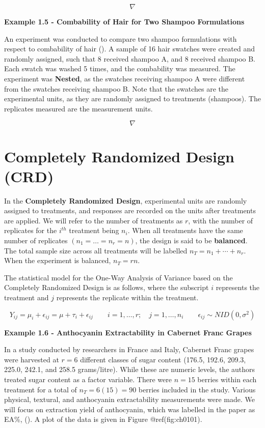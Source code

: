 \documentclass[
]{book}
\begin{document}
\[\nabla\]

\textbf{Example 1.5 - Combability of Hair for Two Shampoo Formulations}

An experiment was conducted to compare two shampoo formulations with
respect to combability of hair (). A sample of 16 hair swatches were created and randomly
assigned, such that 8 received shampoo A, and 8 received shampoo B. Each
swatch was washed 5 times, and the combability was measured. The
experiment was \textbf{Nested}, as the swatches receiving shampoo A were
different from the swatches receiving shampoo B. Note that the swatches
are the experimental units, as they are randomly assigned to treatments
(shampoos). The replicates measured are the measurement units.

\[\nabla\]

\section{Completely Randomized Design
(CRD)}\label{completely-randomized-design-crd}

In the \textbf{Completely Randomized Design}, experimental units are
randomly assigned to treatments, and responses are recorded on the units
after treatments are applied. We will refer to the number of treatments
as \(r\), with the number of replicates for the \(i^{th}\) treatment
being \(n_i\). When all treatments have the same number of replicates
\((n_1=\ldots =n_r=n)\), the design is said to be \textbf{balanced}. The
total sample size across all treatments will be labelled
\(n_T=n_1+\cdots+n_r\). When the experiment is balanced, \(n_T=rn\).

The statistical model for the One-Way Analysis of Variance based on the
Completely Randomized Design is as follows, where the subscript \(i\)
represents the treatment and \(j\) represents the replicate within the
treatment.

\[ Y_{ij}=\mu_i + \epsilon_{ij} = \mu + \tau_i + \epsilon_{ij}
\qquad i=1,\ldots,r; \quad j=1,\ldots, n_i \qquad \epsilon_{ij} \sim NID\left(0,\sigma^2\right) \]

\textbf{Example 1.6 - Anthocyanin Extractability in Cabernet Franc
Grapes}

In a study conducted by researchers in France and Italy, Cabernet Franc
grapes were harvested at \(r=6\) different classes of sugar content
(176.5, 192.6, 209.3, 225.0, 242.1, and 258.5 grams/litre). While these
are numeric levels, the authors treated sugar content as a factor
variable. There were \(n=15\) berries within each treatment for a total
of \(n_T=6(15)=90\) berries included in the study. Various physical,
textural, and anthocyanin extractability measurements were made. We will
focus on extraction yield of anthocyanin, which was labelled in the
paper as EA\%, (). A plot of
the data is given in Figure @ref(fig:ch0101).
\end{document}

